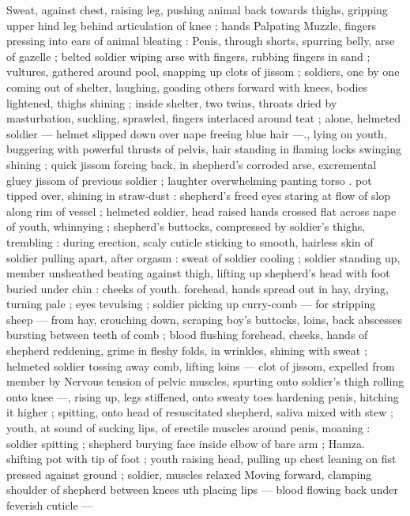 Sweat, against chest, raising leg, pushing animal back towards 
thighs, gripping upper hind leg behind articulation of knee ; hands 
Palpating Muzzle, fingers pressing into ears of animal bleating : 
Penis, through shorts, spurring belly, arse of gazelle ; belted soldier 
wiping arse with fingers, rubbing fingers in sand ; vultures, gathered 
around pool, snapping up clots of jissom ; soldiers, one by one 
coming out of shelter, laughing, goading others forward with knees, 
bodies lightened, thighs shining ; inside shelter, two twins, throats 
dried by masturbation, suckling, sprawled, fingers interlaced around 
teat ; alone, helmeted soldier --- helmet slipped down over nape 
freeing blue hair ---., lying on youth, buggering with powerful thrusts 
of pelvis, hair standing in flaming locks swinging shining ; quick 
jissom forcing back, in shepherd's corroded arse, excremental gluey 
jissom of previous soldier ; laughter overwhelming panting torso . 
pot tipped over, shining in straw-dust : shepherd's freed eyes staring 
at flow of slop along rim of vessel ; helmeted soldier, head raised 
hands crossed flat across nape of youth, whinnying ; shepherd's 
buttocks, compressed by soldier's thighs, trembling : during 
erection, scaly cuticle sticking to smooth, hairless skin of soldier 
pulling apart, after orgasm : sweat of soldier cooling ; soldier 
standing up, member unsheathed beating against thigh, lifting up 
shepherd's head with foot buried under chin : cheeks of youth. 
forehead, hands spread out in hay, drying, turning pale ; eyes 
tevulsing ; soldier picking up curry-comb --- for stripping sheep --- 
from hay, crouching down, scraping boy's buttocks, loins, back 
abscesses bursting between teeth of comb ; blood flushing 
forehead, cheeks, hands of shepherd reddening, grime in fleshy 
folds, in wrinkles, shining with sweat ; helmeted soldier tossing away 
comb, lifting loins --- clot of jissom, expelled from member by 
Nervous tension of pelvic muscles, spurting onto soldier's thigh 
rolling onto knee ---, rising up, legs stiffened, onto sweaty toes 
hardening penis, hitching it higher ; spitting, onto head of 
resuscitated shepherd, saliva mixed with stew ; youth, at sound of 
sucking lips, of erectile muscles around penis, moaning : soldier 
spitting ; shepherd burying face inside elbow of bare arm ; Hamza. 
shifting pot with tip of foot ; youth raising head, pulling up chest 
leaning on fist pressed against ground ; soldier, muscles relaxed 
Moving forward, clamping shoulder of shepherd between knees 
uth placing lips --- blood flowing back under feverish cuticle --- 
